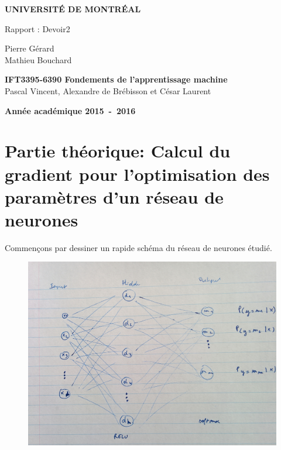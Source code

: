 \documentclass[a4paper,10pt]{article}
\begin{document}
\begin{titlepage}
\begin{center}
\textbf{\textsc{UNIVERSIT\'E DE MONTR\'EAL}}\\
\vfill{}\vfill{}
\begin{center}{\Huge Rapport : Devoir2 }\end{center}{\Huge \par}
\begin{center}{\large Pierre Gérard \\ Mathieu Bouchard}\end{center}{\Huge \par}
\vfill{}\vfill{} \vfill{}
\begin{center}{\large \textbf{IFT3395-6390 Fondements de l'apprentissage machine}}\hfill{\\Pascal Vincent, Alexandre de Brébisson et César Laurent}\end{center}{\large\par}
\vfill{}\vfill{}\enlargethispage{3cm}
\textbf{Année académique 2015~-~2016}
\end{center}
\end{titlepage}





\section{Partie théorique: Calcul du gradient pour l’optimisation des paramètres d'un réseau de neurones}

Commençons par dessiner un rapide schéma du réseau de neurones étudié.

\begin{figure}[H]
	\includegraphics[width=12cm]{reseau.jpg}
	\centering
	\label{fig:comp}
\end{figure}
\end{document}
